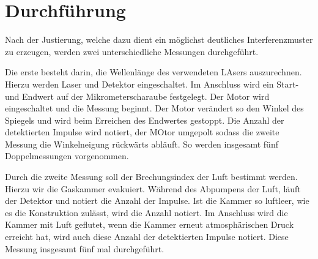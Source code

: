 \section{Durchführung}
\label{sec:Durchführung}

Nach der Justierung, welche dazu dient ein möglichst deutliches Interferenzmuster zu erzeugen, werden zwei unterschiedliche Messungen durchgeführt.

Die erste besteht darin, die Wellenlänge des verwendeten LAsers auszurechnen. Hierzu werden Laser und Detektor eingeschaltet. Im Anschluss wird ein Start- und Endwert auf der Mikrometerscharaube festgelegt.
Der Motor wird eingeschaltet und die Messung beginnt. Der Motor verändert so den Winkel des Spiegels und wird beim Erreichen des Endwertes gestoppt. Die Anzahl der detektierten Impulse wird notiert, der MOtor umgepolt sodass die zweite Messung die Winkelneigung rückwärts abläuft.
So werden insgesamt fünf Doppelmessungen vorgenommen.

Durch die zweite Messung soll der Brechungsindex der Luft bestimmt werden. Hierzu wir die Gaskammer evakuiert. Während des Abpumpens der Luft, läuft der Detektor und notiert die Anzahl der Impulse.
Ist die Kammer so luftleer, wie es die Konstruktion zulässt, wird die Anzahl notiert. Im Anschluss wird die Kammer mit Luft geflutet, wenn die Kammer erneut atmosphärischen Druck erreicht hat, wird auch diese Anzahl der
detektierten Impulse notiert. Diese Messung insgesamt fünf mal durchgeführt.
